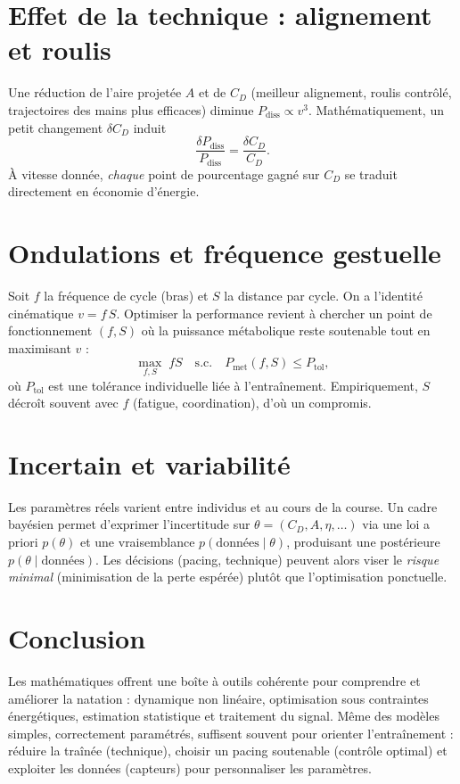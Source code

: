 \documentclass[11pt,a4paper]{article}
\begin{document}
\section{Effet de la technique : alignement et roulis}
Une réduction de l'aire projetée $A$ et de $C_D$ (meilleur alignement, roulis contrôlé, trajectoires des mains plus efficaces) diminue $P_{\mathrm{diss}}\propto v^3$. Mathématiquement, un petit changement $\delta C_D$ induit
\begin{equation}
 \frac{\delta P_{\mathrm{diss}}}{P_{\mathrm{diss}}} = \frac{\delta C_D}{C_D}.
 \end{equation}
À vitesse donnée, \emph{chaque} point de pourcentage gagné sur $C_D$ se traduit directement en économie d'énergie.

\section{Ondulations et fréquence gestuelle}
Soit $f$ la fréquence de cycle (bras) et $S$ la distance par cycle. On a l'identité cinématique $v=f\,S$. Optimiser la performance revient à chercher un point de fonctionnement $(f,S)$ où la puissance métabolique reste soutenable tout en maximisant $v$ :
\begin{equation}
 \max_{f,S}\; fS \quad \text{s.c.}\quad P_{\mathrm{met}}(f,S)\le P_{\mathrm{tol}},
 \end{equation}
où $P_{\mathrm{tol}}$ est une tolérance individuelle liée à l'entraînement. Empiriquement, $S$ décroît souvent avec $f$ (fatigue, coordination), d'où un compromis.

\section{Incertain et variabilité}
Les paramètres réels varient entre individus et au cours de la course. Un cadre bayésien permet d'exprimer l'incertitude sur $\theta=(C_D,A,\eta,\ldots)$ via une loi a priori $p(\theta)$ et une vraisemblance $p(\text{données}\mid\theta)$, produisant une postérieure $p(\theta\mid\text{données})$. Les décisions (pacing, technique) peuvent alors viser le \emph{risque minimal} (minimisation de la perte espérée) plutôt que l'optimisation ponctuelle.

\section{Conclusion}
Les mathématiques offrent une boîte à outils cohérente pour comprendre et améliorer la natation : dynamique non linéaire, optimisation sous contraintes énergétiques, estimation statistique et traitement du signal. Même des modèles simples, correctement paramétrés, suffisent souvent pour orienter l'entraînement : réduire la traînée (technique), choisir un pacing soutenable (contrôle optimal) et exploiter les données (capteurs) pour personnaliser les paramètres.
\end{document}
